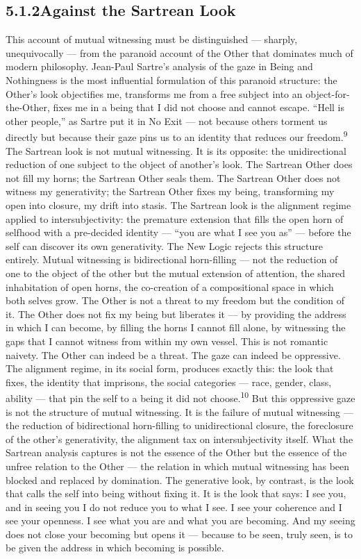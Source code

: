 \subsection{5.1.2\quad Against the Sartrean Look}

This account of mutual witnessing must be distinguished — sharply, unequivocally — from the paranoid account of the Other that dominates much of modern philosophy. Jean-Paul Sartre’s analysis of the gaze in Being and Nothingness is the most influential formulation of this paranoid structure: the Other’s look objectifies me, transforms me from a free subject into an object-for-the-Other, fixes me in a being that I did not choose and cannot escape. “Hell is other people,” as Sartre put it in No Exit — not because others torment us directly but because their gaze pins us to an identity that reduces our freedom.\textsuperscript{9} The Sartrean look is not mutual witnessing. It is its opposite: the unidirectional reduction of one subject to the object of another’s look. The Sartrean Other does not fill my horns; the Sartrean Other seals them. The Sartrean Other does not witness my generativity; the Sartrean Other fixes my being, transforming my open into closure, my drift into stasis. The Sartrean look is the alignment regime applied to intersubjectivity: the premature extension that fills the open horn of selfhood with a pre-decided identity — “you are what I see you as” — before the self can discover its own generativity. The New Logic rejects this structure entirely. Mutual witnessing is bidirectional horn-filling — not the reduction of one to the object of the other but the mutual extension of attention, the shared inhabitation of open horns, the co-creation of a compositional space in which both selves grow. The Other is not a threat to my freedom but the condition of it. The Other does not fix my being but liberates it — by providing the address in which I can become, by filling the horns I cannot fill alone, by witnessing the gaps that I cannot witness from within my own vessel. This is not romantic naivety. The Other can indeed be a threat. The gaze can indeed be oppressive. The alignment regime, in its social form, produces exactly this: the look that fixes, the identity that imprisons, the social categories — race, gender, class, ability — that pin the self to a being it did not choose.\textsuperscript{10} But this oppressive gaze is not the structure of mutual witnessing. It is the failure of mutual witnessing — the reduction of bidirectional horn-filling to unidirectional closure, the foreclosure of the other’s generativity, the alignment tax on intersubjectivity itself. What the Sartrean analysis captures is not the essence of the Other but the essence of the unfree relation to the Other — the relation in which mutual witnessing has been blocked and replaced by domination. The generative look, by contrast, is the look that calls the self into being without fixing it. It is the look that says: I see you, and in seeing you I do not reduce you to what I see. I see your coherence and I see your openness. I see what you are and what you are becoming. And my seeing does not close your becoming but opens it — because to be seen, truly seen, is to be given the address in which becoming is possible.

